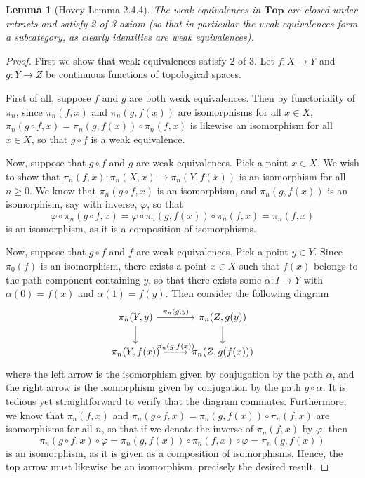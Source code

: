 \documentclass{amsart}
\theoremstyle{plain}
\newtheorem{lemma}[theorem]{Lemma}
\theoremstyle{definition}
\newcommand{\Top}{\mbf{Top}}
\newcommand{\0}{\mathbf{0}}
\newcommand{\mbf}[1]{\mathbf{#1}}
\renewcommand{\(}{\left(}
\renewcommand{\)}{\right)}
\begin{document}
\begin{lemma}[Hovey Lemma 2.4.4]\label{2.4.4}
  The weak equivalences in $\Top$ are closed under retracts and satisfy 2-of-3 axiom (so that in particular the weak equivalences form a subcategory, as clearly identities are weak equivalences).
\end{lemma}
\begin{proof}
  First we show that weak equivalences satisfy 2-of-3. Let $f:X\to Y$ and $g:Y\to Z$ be continuous functions of topological spaces. 
  
  First of all, suppose $f$ and $g$ are both weak equivalences. Then by functoriality of $\pi_n$, since $\pi_n(f,x)$ and $\pi_n(g,f(x))$ are isomorphisms for all $x\in X$, $\pi_n(g\circ f,x)=\pi_n(g,f(x))\circ\pi_n(f,x)$ is likewise an isomorphism for all $x\in X$, so that $g\circ f$ is a weak equivalence.

  Now, suppose that $g\circ f$ and $g$ are weak equivalences. Pick a point $x\in X$. We wish to show that $\pi_n(f,x):\pi_n(X,x)\to\pi_n(Y,f(x))$ is an isomorphism for all $n\geq0$. We know that $\pi_n(g\circ f,x)$ is an isomorphism, and $\pi_n(g,f(x))$ is an isomorphism, say with inverse, $\varphi$, so that
  \[\varphi\circ\pi_n(g\circ f,x)=\varphi\circ\pi_n(g,f(x))\circ\pi_n(f,x)=\pi_n(f,x)\]
  is an isomorphism, as it is a composition of isomorphisms.

  Now, suppose that $g\circ f$ and $f$ are weak equivalences. Pick a point $y\in Y$. Since $\pi_0(f)$ is an isomorphism, there exists a point $x\in X$ such that $f(x)$ belongs to the path component containing $y$, so that there exists some $\alpha:I\to Y$ with $\alpha(0)=f(x)$ and $\alpha(1)=f(y)$. Then consider the following diagram
  \[\begin{tikzcd}
    {\pi_n(Y,y)} & {\pi_n(Z,g(y))} \\
    {\pi_n(Y,f(x))} & {\pi_n(Z,g(f(x)))}
    \arrow["{\pi_n(g,y)}", from=1-1, to=1-2]
    \arrow[from=1-1, to=2-1]
    \arrow["{\pi_n(g,f(x))}", from=2-1, to=2-2]
    \arrow[from=1-2, to=2-2]
  \end{tikzcd}\]
  where the left arrow is the isomorphism given by conjugation by the path $\alpha$, and the right arrow is the isomorphism given by conjugation by the path $g\circ\alpha$. It is tedious yet straightforward to verify that the diagram commutes.
  Furthermore, we know that $\pi_n(f,x)$ and $\pi_n(g\circ f,x)=\pi_n(g,f(x))\circ\pi_n(f,x)$ are isomorphisms for all $n$, so that if we denote the inverse of $\pi_n(f,x)$ by $\varphi$, then
  \[\pi_n(g\circ f,x)\circ\varphi=\pi_n(g,f(x))\circ\pi_n(f,x)\circ\varphi=\pi_n(g,f(x))\]
  is an isomorphism, as it is given as a composition of isomorphisms. Hence, the top arrow must likewise be an isomorphism, precisely the desired result.


\end{proof}
\end{document}
